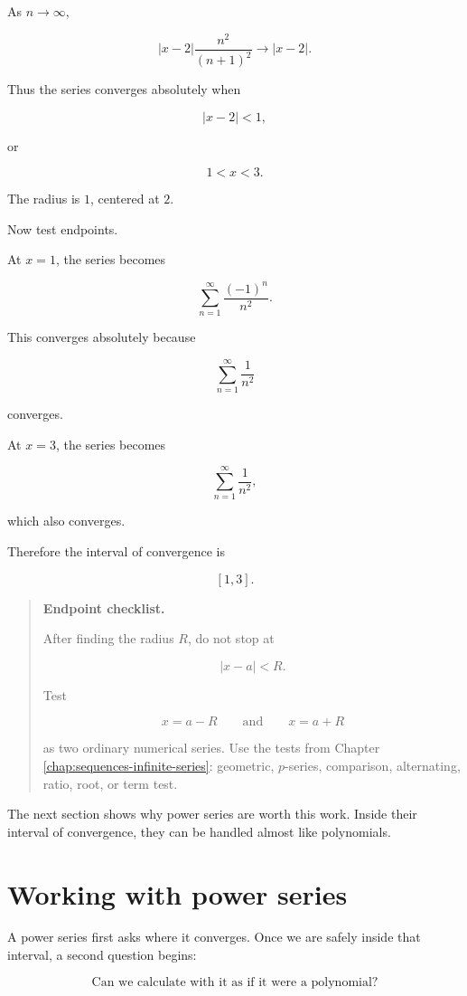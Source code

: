 As \(n\to\infty\),

\[
|x-2|\frac{n^2}{(n+1)^2}\to |x-2|.
\]

Thus the series converges absolutely when

\[
|x-2|<1,
\]

or

\[
1<x<3.
\]

The radius is \(1\), centered at \(2\).

Now test endpoints.

At \(x=1\), the series becomes

\[
\sum_{n=1}^{\infty}\frac{(-1)^n}{n^2}.
\]

This converges absolutely because

\[
\sum_{n=1}^{\infty}\frac1{n^2}
\]

converges.

At \(x=3\), the series becomes

\[
\sum_{n=1}^{\infty}\frac1{n^2},
\]

which also converges.

Therefore the interval of convergence is

\[
\boxed{[1,3].}
\]

\begin{quote}
\textbf{Endpoint checklist.}

After finding the radius \(R\), do not stop at

\[
|x-a|<R.
\]

Test

\[
x=a-R
\qquad\text{and}\qquad
x=a+R
\]

as two ordinary numerical series.  Use the tests from Chapter \ref{chap:sequences-infinite-series}:
geometric, \(p\)-series, comparison, alternating, ratio, root, or term test.
\end{quote}

The next section shows why power series are worth this work.  Inside their interval of
convergence, they can be handled almost like polynomials.

\section{Working with power series}
\label{sec:working-with-power-series}

A power series first asks where it converges.  Once we are safely inside that interval,
a second question begins:

\[
\boxed{
\text{Can we calculate with it as if it were a polynomial?}
}
\]

